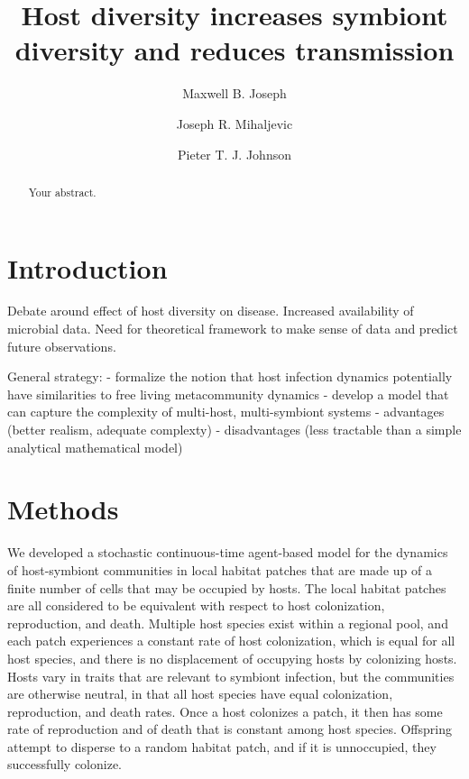 \documentclass[12pt]{article}
\title{Host diversity increases symbiont diversity and reduces transmission}
\author[1]{Maxwell B. Joseph}
\author[2]{Joseph R. Mihaljevic}
\author[1]{Pieter T. J. Johnson}
\affil[1]{Ecology and Evolutionary Biology, University of Colorado, Boulder}
\affil[2]{Ecology and Evolution, University of Chicago}
\date{}
\begin{document}
\maketitle

\begin{abstract}
Your abstract.
\end{abstract}

\section*{Introduction}

Debate around effect of host diversity on disease. 
Increased availability of microbial data. 
Need for theoretical framework to make sense of data and predict future observations.

General strategy: 
- formalize the notion that host infection dynamics potentially have similarities to free living metacommunity dynamics
- develop a model that can capture the complexity of multi-host, multi-symbiont systems
- advantages (better realism, adequate complexty)
- disadvantages (less tractable than a simple analytical mathematical model)

\section*{Methods}

We developed a stochastic continuous-time agent-based model for the dynamics of host-symbiont communities in local habitat patches that are made up of a finite number of cells that may be occupied by hosts. 
The local habitat patches are all considered to be equivalent with respect to host colonization, reproduction, and death. 
Multiple host species exist within a regional pool, and each patch experiences a constant rate of host colonization, which is equal for all host species, and there is no displacement of occupying hosts by colonizing hosts. 
Hosts vary in traits that are relevant to symbiont infection, but the communities are otherwise neutral, in that all host species have equal colonization, reproduction, and death rates. 
Once a host colonizes a patch, it then has some rate of reproduction and of death that is constant among host species.
Offspring attempt to disperse to a random habitat patch, and if it is unnoccupied, they successfully colonize.
\end{document}
